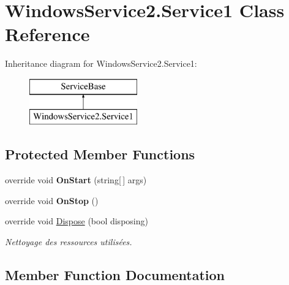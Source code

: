 \hypertarget{class_windows_service2_1_1_service1}{}\section{Windows\+Service2.\+Service1 Class Reference}
\label{class_windows_service2_1_1_service1}
Inheritance diagram for Windows\+Service2.\+Service1\+:\begin{figure}[H]
\begin{center}
\leavevmode
\includegraphics[height=2.000000cm]{class_windows_service2_1_1_service1}
\end{center}
\end{figure}
\subsection*{Protected Member Functions}
\begin{DoxyCompactItemize}
\item 
\mbox{\label{class_windows_service2_1_1_service1_a7d9b5a885bc3713034b13e2e8100fd68}} 
override void {\bfseries On\+Start} (string\mbox{[}$\,$\mbox{]} args)
\item 
\mbox{\label{class_windows_service2_1_1_service1_a25f5150d3c26bc7d9ea95166843de7f8}} 
override void {\bfseries On\+Stop} ()
\item 
override void \mbox{\hyperlink{class_windows_service2_1_1_service1_a35d81f8e347bf414b8163f34fd9d9796}{Dispose}} (bool disposing)
\begin{DoxyCompactList}\small\item\em Nettoyage des ressources utilisées. \end{DoxyCompactList}\end{DoxyCompactItemize}


\subsection{Member Function Documentation}
\mbox{\label{class_windows_service2_1_1_service1_a35d81f8e347bf414b8163f34fd9d9796}} 
